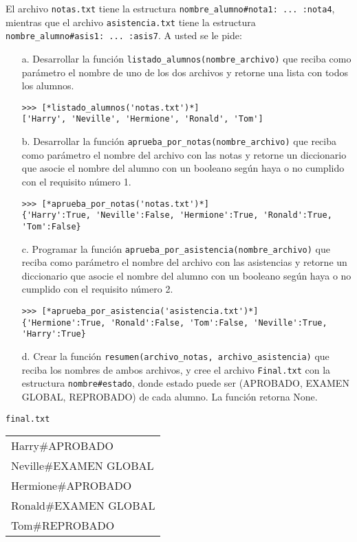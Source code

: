 El archivo \texttt{notas.txt} tiene la estructura \texttt{nombre\_alumno\#nota1: ... :nota4}, mientras que el archivo \texttt{asistencia.txt} tiene la estructura \texttt{nombre\_alumno\#asis1: ... :asis7}. A usted se le pide:

\begin{itemize}
    \item[a.] Desarrollar la función \texttt{listado\_alumnos(nombre\_archivo)} que reciba como parámetro el nombre de uno de los dos archivos y retorne una lista con todos los alumnos.
    \begin{lstlisting}[style=consola]
>>> [*listado_alumnos('notas.txt')*]
['Harry', 'Neville', 'Hermione', 'Ronald', 'Tom']
    \end{lstlisting}

    \item[b.] Desarrollar la función \texttt{aprueba\_por\_notas(nombre\_archivo)} que reciba como parámetro el nombre del archivo con las notas y retorne un diccionario que asocie el nombre del alumno con un booleano según haya o no cumplido con el requisito número 1.
    \begin{lstlisting}[style=consola]
>>> [*aprueba_por_notas('notas.txt')*]
{'Harry':True, 'Neville':False, 'Hermione':True, 'Ronald':True, 'Tom':False}
    \end{lstlisting}

    \item[c.] Programar la función \texttt{aprueba\_por\_asistencia(nombre\_archivo)} que reciba como parámetro el nombre del archivo con las asistencias y retorne un diccionario que asocie el nombre del alumno con un booleano según haya o no cumplido con el requisito número 2.
    \begin{lstlisting}[style=consola]
>>> [*aprueba_por_asistencia('asistencia.txt')*]
{'Hermione':True, 'Ronald':False, 'Tom':False, 'Neville':True, 'Harry':True}
    \end{lstlisting}

    \item[d.] Crear la función \texttt{resumen(archivo\_notas, archivo\_asistencia)} que reciba los nombres de ambos archivos, y cree el archivo \texttt{Final.txt} con la estructura \texttt{nombre\#estado}, donde estado puede ser (APROBADO, EXAMEN GLOBAL, REPROBADO) de cada alumno. La función retorna None.

\end{itemize}

\begin{center}
    \texttt{final.txt} \\
	\begin{tabular}{|l|}
		\hline
Harry\#APROBADO\\
Neville\#EXAMEN GLOBAL\\
Hermione\#APROBADO\\
Ronald\#EXAMEN GLOBAL\\
Tom\#REPROBADO\\
		\hline
	\end{tabular}
\end{center}
